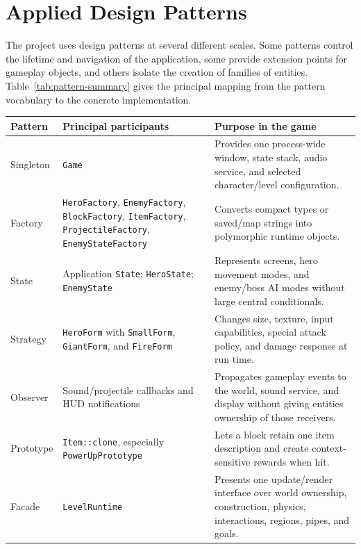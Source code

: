 \section{Applied Design Patterns}
\label{sec:applied-design-patterns}
\begingroup
\sloppy

The project uses design patterns at several different scales.  Some patterns
control the lifetime and navigation of the application, some provide extension
points for gameplay objects, and others isolate the creation of families of
entities.  Table~\ref{tab:pattern-summary} gives the principal mapping from the
pattern vocabulary to the concrete implementation.

\begin{table}[htbp]
    \centering
    \small
    \renewcommand{\arraystretch}{1.2}
    \begin{tabular}{|p{}|p{}|p{}|}
        \hline
        \textbf{Pattern} & \textbf{Principal participants} & \textbf{Purpose in the game} \\
        \hline
        Singleton & \texttt{Game} & Provides one process-wide window, state stack, audio service, and selected character/level configuration. \\
        \hline
        Factory & \texttt{HeroFactory}, \texttt{EnemyFactory}, \texttt{BlockFactory}, \texttt{ItemFactory}, \texttt{ProjectileFactory}, \texttt{EnemyStateFactory} & Converts compact types or saved/map strings into polymorphic runtime objects. \\
        \hline
        State & Application \texttt{State}; \texttt{HeroState}; \texttt{EnemyState} & Represents screens, hero movement modes, and enemy/boss AI modes without large central conditionals. \\
        \hline
        Strategy & \texttt{HeroForm} with \texttt{SmallForm}, \texttt{GiantForm}, and \texttt{FireForm} & Changes size, texture, input capabilities, special attack policy, and damage response at run time. \\
        \hline
        Observer & Sound/projectile callbacks and HUD notifications & Propagates gameplay events to the world, sound service, and display without giving entities ownership of those receivers. \\
        \hline
        Prototype & \texttt{Item::clone}, especially \texttt{PowerUpPrototype} & Lets a block retain one item description and create context-sensitive rewards when hit. \\
        \hline
        Facade & \texttt{LevelRuntime} & Presents one update/render interface over world ownership, construction, physics, interactions, regions, pipes, and goals. \\

\end{tabular}
\end{table}
